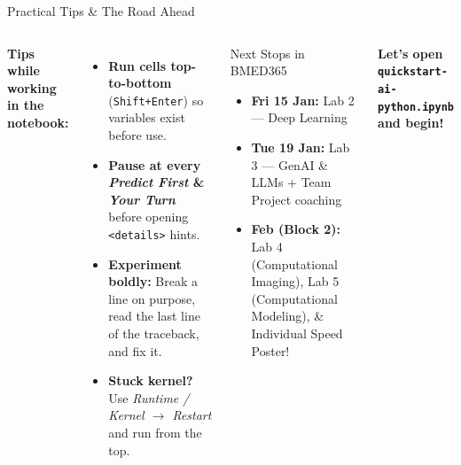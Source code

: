 \documentclass[aspectratio=169, 10pt]{beamer}
\begin{document}
\begin{frame}{Practical Tips \& The Road Ahead}
    \begin{columns}[T,onlytextwidth]
        \textbf{Tips while working in the notebook:}
        \begin{itemize}
            \item \textbf{Run cells top-to-bottom} (\texttt{Shift+Enter}) so variables exist before use.
            \item \textbf{Pause at every \textit{Predict First} \& \textit{Your Turn}} before opening \texttt{<details>} hints.
            \item \textbf{Experiment boldly:} Break a line on purpose, read the last line of the traceback, and fix it.
            \item \textbf{Stuck kernel?} Use \textit{Runtime / Kernel $\rightarrow$ Restart} and run from the top.
        \end{itemize}

        \begin{exampleblock}{Next Stops in BMED365}
            \begin{itemize}
                \item \textbf{Fri 15 Jan:} Lab 2 --- Deep Learning
                \item \textbf{Tue 19 Jan:} Lab 3 --- GenAI \& LLMs + Team Project coaching
                \item \textbf{Feb (Block 2):} Lab 4 (Computational Imaging), Lab 5 (Computational Modeling), \& Individual Speed Poster!
            \end{itemize}
        \end{exampleblock}

        \vspace{0.25cm}
        \centering
        \textbf{Let's open \texttt{quickstart-ai-python.ipynb} and begin!}
    \end{columns}
\end{frame}
\end{document}
